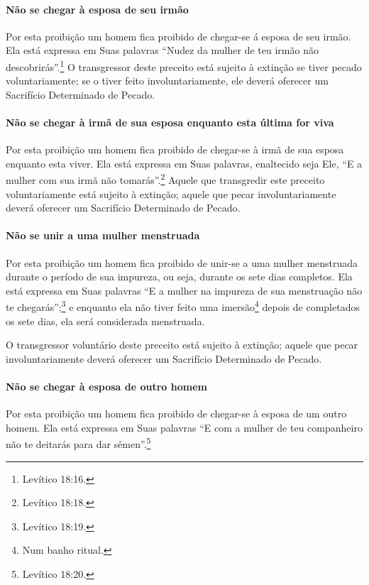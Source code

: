 \paragraph{Não se chegar à esposa de seu irmão}

Por esta proibição um homem fica proibido de chegar-se á esposa de seu
irmão. Ela está expressa em Suas palavras ``Nudez da mulher de teu
irmão não descobrirás''.\footnote{Levítico 18:16.} O transgressor deste preceito
está sujeito à extinção se tiver pecado voluntariamente; se o tiver
feito involuntariamente, ele deverá oferecer um Sacrifício Determinado
de Pecado.

\paragraph{Não se chegar à irmã de sua esposa enquanto esta última for viva}

Por esta proibição um homem fica proibido de chegar-se à irmã de sua
esposa enquanto esta viver. Ela está expressa em Suas palavras,
enaltecido seja Ele, ``E a mulher com sua irmã não tomarás''.\footnote{Levítico
18:18.} Aquele que transgredir este preceito voluntariamente está
sujeito à extinção; aquele que pecar involuntariamente deverá oferecer
um Sacrifício Determinado de Pecado.

\paragraph{Não se unir a uma mulher menstruada}

Por esta proibição um homem fica proibido de unir-se a uma mulher
menstruada durante o período de sua impureza, ou seja, durante os sete
dias completos. Ela está expressa em Suas palavras ``E a mulher na impureza
de sua menstruação não te chegarás'';\footnote{Levítico 18:19.} e enquanto ela
não tiver feito uma imersão\footnote{Num banho ritual.} depois de completados
os sete dias, ela será considerada menstruada.

O transgressor voluntário deste preceito está sujeito à extinção; aquele
que pecar involuntariamente deverá oferecer um Sacrifício Determinado de
Pecado.

\paragraph{Não se chegar à esposa de outro homem}

Por esta proibição um homem fica proibido de chegar-se à esposa de um
outro homem. Ela está expressa em Suas palavras ``E com a mulher de teu
companheiro não te deitarás para dar sêmen''.\footnote{Levítico 18:20.}

